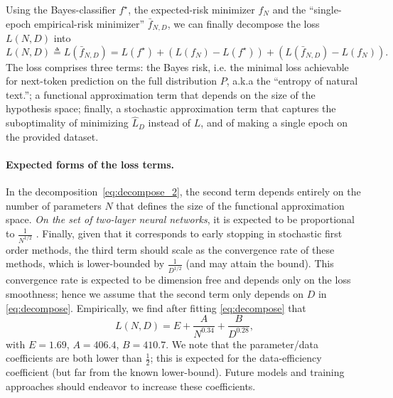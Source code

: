\documentclass[11pt, a4paper, logo, copyright, nonumbering]{deepmind}
\begin{document}
Using the Bayes-classifier $f^\star$, the expected-risk minimizer $f_N$ and the ``single-epoch empirical-risk minimizer'' $\bar f_{N,D}$, we can finally decompose the loss $L(N,D)$ into
% 
\begin{equation}\label{eq:decompose_2}
    L(N,D) \triangleq L(\bar f_{N,D}) = L(f^\star) + \left( L(f_N) - L(f^\star) \right) + \left( L(\bar f_{N,D}) - L(f_N) \right).
\end{equation}
% 
The loss comprises three terms: the Bayes risk, i.e. the minimal loss achievable for next-token prediction on the full distribution $P$, a.k.a the ``entropy of natural text.''; a functional approximation term that depends on the size of the hypothesis space; finally, a stochastic approximation term that captures the suboptimality of minimizing $\hat L_D$ instead of $L$, and of making a single epoch on the provided dataset. 

\paragraph{Expected forms of the loss terms.}
In the decomposition~\eqref{eq:decompose_2}, the second term depends entirely on the number of parameters $N$ that defines the size of the functional approximation space.
\textit{On the set of two-layer neural networks}, it is expected to be proportional to $\frac{1}{N^{1/2}}$ \citep{siegel_approximation_2020}.
Finally, given that it corresponds to early stopping in stochastic first order methods, the third term should scale as the convergence rate of these methods, which is lower-bounded by $\frac{1}{D^{1/2}}$ \citep{robbins_stochastic_1951}  (and may attain the bound). This convergence rate is expected to be dimension free \cite[see e.g.][for a review]{bubeck_convex_2015} and depends only on the loss smoothness; hence we assume that the second term only depends on $D$ in \eqref{eq:decompose}.
% 
Empirically, we find after fitting \eqref{eq:decompose} that
\begin{equation}
    L(N, D) = E + \frac{A}{N^{0.34}} + \frac{B}{D^{0.28}},
\end{equation}
with $E=1.69$, $A=406.4$, $B=410.7$. We note that the parameter/data coefficients are both lower than $\frac{1}{2}$; this is expected for the data-efficiency coefficient (but far from the known lower-bound).
Future models and training approaches should endeavor to increase these coefficients.

\end{document}
